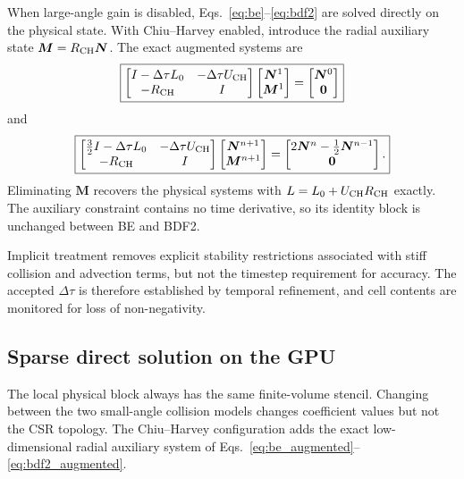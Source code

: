 \documentclass[11pt]{article}
\begin{document}
When large-angle gain is disabled, Eqs.~\eqref{eq:be}--\eqref{eq:bdf2} are solved
directly on the physical state.  With Chiu--Harvey enabled, introduce the radial
auxiliary state $\bm M=R_{\rm CH}\bm N$.  The exact augmented systems are
\begin{equation}
 \boxed{
 \begin{bmatrix}
  I-\Delta\tau L_0 & -\Delta\tau U_{\rm CH}\\
  -R_{\rm CH} & I
 \end{bmatrix}
 \begin{bmatrix}\bm N^1\\\bm M^1\end{bmatrix}
 =\begin{bmatrix}\bm N^0\\\bm0\end{bmatrix}
 }
 \label{eq:be_augmented}
\end{equation}
and
\begin{equation}
 \boxed{
 \begin{bmatrix}
  \frac32 I-\Delta\tau L_0 & -\Delta\tau U_{\rm CH}\\
  -R_{\rm CH} & I
 \end{bmatrix}
 \begin{bmatrix}\bm N^{n+1}\\\bm M^{n+1}\end{bmatrix}
 =\begin{bmatrix}2\bm N^n-\frac12\bm N^{n-1}\\\bm0\end{bmatrix}.
 }
 \label{eq:bdf2_augmented}
\end{equation}
Eliminating $\bm M$ recovers the physical systems with
$L=L_0+U_{\rm CH}R_{\rm CH}$ exactly.  The auxiliary constraint contains no time
derivative, so its identity block is unchanged between BE and BDF2.

Implicit treatment removes explicit stability restrictions associated with stiff
collision and advection terms, but not the timestep requirement for accuracy.  The
accepted $\Delta\tau$ is therefore established by temporal refinement, and cell contents
are monitored for loss of non-negativity.

\subsection{Sparse direct solution on the GPU}

The local physical block always has the same finite-volume stencil.  Changing between
the two small-angle collision models changes coefficient values but not the CSR topology.
The Chiu--Harvey configuration adds the exact low-dimensional radial auxiliary system of
Eqs.~\eqref{eq:be_augmented}--\eqref{eq:bdf2_augmented}.
\end{document}
